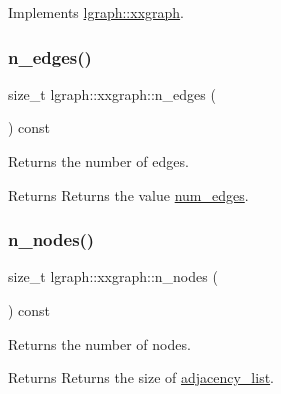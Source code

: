 Implements \hyperlink{classlgraph_1_1xxgraph_a0a606d77cbbb2efa7056b82c3b8c395c}{lgraph\+::xxgraph}.

\mbox{\label{classlgraph_1_1xxgraph_af00bce8b07a42754601d1e3bebe2c1fa}} 
\subsubsection{\texorpdfstring{n\+\_\+edges()}{n\_edges()}}
{\footnotesize\ttfamily size\+\_\+t lgraph\+::xxgraph\+::n\+\_\+edges (\begin{DoxyParamCaption}{ }\end{DoxyParamCaption}) const\hspace{0.3cm}{\ttfamily [inherited]}}



Returns the number of edges. 

\begin{DoxyReturn}{Returns}
Returns the value \hyperlink{classlgraph_1_1xxgraph_a6765a9a3be42f6e0f824635c593b35d7}{num\+\_\+edges}. 
\end{DoxyReturn}
\mbox{\label{classlgraph_1_1xxgraph_a67f651617ada4053b569102b9a54cab0}} 
\subsubsection{\texorpdfstring{n\+\_\+nodes()}{n\_nodes()}}
{\footnotesize\ttfamily size\+\_\+t lgraph\+::xxgraph\+::n\+\_\+nodes (\begin{DoxyParamCaption}{ }\end{DoxyParamCaption}) const\hspace{0.3cm}{\ttfamily [inherited]}}



Returns the number of nodes. 

\begin{DoxyReturn}{Returns}
Returns the size of \hyperlink{classlgraph_1_1xxgraph_a31cf82d0b20be05290be259dc97a51ec}{adjacency\+\_\+list}. 
\end{DoxyReturn}
\mbox{\label{classlgraph_1_1xxgraph_a90a9b60caf18179576af61dc962b95e3}} 
